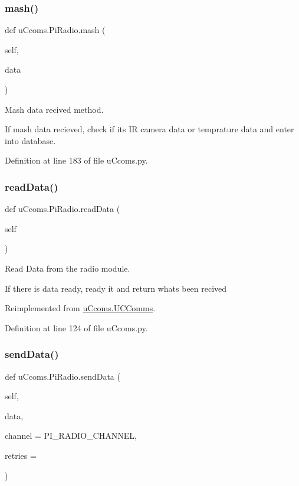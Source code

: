 \subsubsection{\texorpdfstring{mash()}{mash()}}
{\footnotesize\ttfamily def u\+Ccoms.\+Pi\+Radio.\+mash (\begin{DoxyParamCaption}\item[{}]{self,  }\item[{}]{data }\end{DoxyParamCaption})}



Mash data recived method. 

If mash data recieved, check if its IR camera data or temprature data and enter into database. 

Definition at line 183 of file u\+Ccoms.\+py.

\mbox{\label{classu_ccoms_1_1_pi_radio_a319c15c0bf996c01e7b6032c56292ffe}} 
\subsubsection{\texorpdfstring{readData()}{readData()}}
{\footnotesize\ttfamily def u\+Ccoms.\+Pi\+Radio.\+read\+Data (\begin{DoxyParamCaption}\item[{}]{self }\end{DoxyParamCaption})}



Read Data from the radio module. 

If there is data ready, ready it and return whats been recived 

Reimplemented from \mbox{\hyperlink{classu_ccoms_1_1_u_c_comms_aba3c5a6a0e277e721590343626b5a700}{u\+Ccoms.\+U\+C\+Comms}}.



Definition at line 124 of file u\+Ccoms.\+py.

\mbox{\label{classu_ccoms_1_1_pi_radio_a78cdababf2338a12369f6df3b5be792c}} 
\subsubsection{\texorpdfstring{sendData()}{sendData()}}
{\footnotesize\ttfamily def u\+Ccoms.\+Pi\+Radio.\+send\+Data (\begin{DoxyParamCaption}\item[{}]{self,  }\item[{}]{data,  }\item[{}]{channel = {\ttfamily PI\+\_\+RADIO\+\_\+CHANNEL},  }\item[{}]{retries = {} }\end{DoxyParamCaption})}



